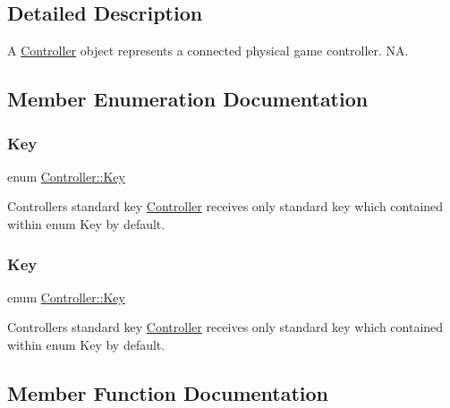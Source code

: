 \subsection{Detailed Description}
A \hyperlink{classController}{Controller} object represents a connected physical game controller.  NA. 

\subsection{Member Enumeration Documentation}
\mbox{\label{classController_afdf85a1e7a9a3f5943935ac99fb76906}} 
\subsubsection{\texorpdfstring{Key}{Key}\hspace{0.1cm}{\footnotesize\ttfamily [1/2]}}
{\footnotesize\ttfamily enum \hyperlink{classController_afdf85a1e7a9a3f5943935ac99fb76906}{Controller\+::\+Key}}

Controllers\textquotesingle{} standard key \hyperlink{classController}{Controller} receives only standard key which contained within enum Key by default. \mbox{\label{classController_afdf85a1e7a9a3f5943935ac99fb76906}} 
\subsubsection{\texorpdfstring{Key}{Key}\hspace{0.1cm}{\footnotesize\ttfamily [2/2]}}
{\footnotesize\ttfamily enum \hyperlink{classController_afdf85a1e7a9a3f5943935ac99fb76906}{Controller\+::\+Key}}

Controllers\textquotesingle{} standard key \hyperlink{classController}{Controller} receives only standard key which contained within enum Key by default. 

\subsection{Member Function Documentation}
\mbox{\label{classController_a5fc9812dfd76de7a0457589035472575}} 
